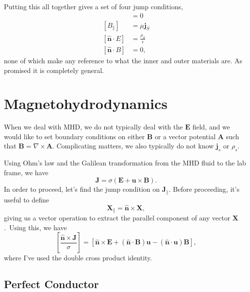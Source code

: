 \documentclass[11pt]{article}
\newcommand{\norm}{\hat{\mathbf{n}}}
\begin{document}
Putting this all together gives a set of four jump conditions, 
\begin{align}
  [E_\parallel] &= 0 \label{eq:Epara_jump]}\\
  [B_\parallel] &= \mu \mathbf{j}_S \label{eq:Bpara_jump]}\\
  [\norm \cdot E] &= \frac{\rho_{S}}{\epsilon} \label{eq:Enorm_jump}\\
  [\norm \cdot B] &= 0 \label{eq:Bnorm_jump},
\end{align}
none of which make any reference to what the inner and outer materials are.
As promised it is completely general.

\section{Magnetohydrodynamics}
\label{sec:mhd}

When we deal with MHD, we do not typically deal with the $\mathbf{E}$ field, and we would like to set boundary conditions on either $\mathbf{B}$ or a vector potential $\mathbf{A}$ such that $\mathbf{B} = \nabla \times \mathbf{A}$.
Complicating matters, we also typically do not know $\mathbf{j}_s$ or $\rho_s$.

Using Ohm's law and the Galilean transformation from the MHD fluid to the lab frame, we have
\begin{equation}
  \label{eq:MHD_E}
  \mathbf{J} = \sigma (\mathbf{E} + \mathbf{u} \times \mathbf{B}).
\end{equation}
In order to proceed, let's find the jump condition on $\mathbf{J}_\parallel$.
Before proceeding, it's useful to define
\begin{equation}
  \label{eq:parallel_cross}
  \mathbf{X}_\parallel = \norm \times \mathbf{X},
\end{equation}
giving us a vector operation to extract the parallel component of any vector $\mathbf{X}$.\
Using this, we have
\begin{equation}
  \label{eq:j_jump}
  [\frac{\norm \times \mathbf{J}}{\sigma}] = [\norm \times \mathbf{E} +  (\norm \cdot \mathbf{B}) \mathbf{u} -(\norm \cdot \mathbf{u}) \mathbf{B}],
\end{equation}
where I've used the double cross product identity.

\subsection{Perfect Conductor}
\label{sec:perf_cond}
\end{document}
